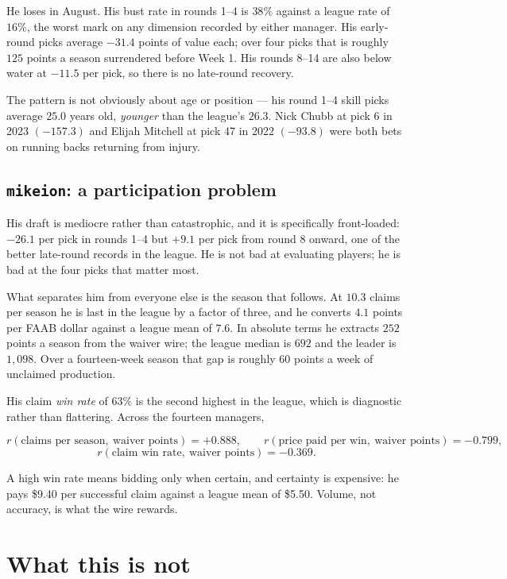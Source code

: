 \documentclass[11pt]{article}
\begin{document}
He loses in August. His bust rate in rounds 1--4 is $38\%$ against a league rate
of $16\%$, the worst mark on any dimension recorded by either manager. His
early-round picks average $-31.4$ points of value each; over four picks that is
roughly $125$ points a season surrendered before Week 1. His rounds 8--14 are
also below water at $-11.5$ per pick, so there is no late-round recovery.

The pattern is not obviously about age or position --- his round 1--4 skill picks
average $25.0$ years old, \emph{younger} than the league's $26.3$. Nick Chubb at
pick 6 in 2023 $(-157.3)$ and Elijah Mitchell at pick 47 in 2022 $(-93.8)$ were
both bets on running backs returning from injury.

\subsection*{\texttt{mikeion}: a participation problem}

His draft is mediocre rather than catastrophic, and it is specifically
front-loaded: $-26.1$ per pick in rounds 1--4 but $+9.1$ per pick from round 8
onward, one of the better late-round records in the league. He is not bad at
evaluating players; he is bad at the four picks that matter most.

What separates him from everyone else is the season that follows. At $10.3$
claims per season he is last in the league by a factor of three, and he converts
$4.1$ points per FAAB dollar against a league mean of $7.6$. In absolute terms he
extracts $252$ points a season from the waiver wire; the league median is $692$
and the leader is $1{,}098$. Over a fourteen-week season that gap is roughly $60$
points a week of unclaimed production.

His claim \emph{win rate} of $63\%$ is the second highest in the league, which is
diagnostic rather than flattering. Across the fourteen managers,

\[
  r(\text{claims per season},\ \text{waiver points}) = +0.888, \qquad
  r(\text{price paid per win},\ \text{waiver points}) = -0.799,
\]
\[
  r(\text{claim win rate},\ \text{waiver points}) = -0.369 .
\]

\noindent A high win rate means bidding only when certain, and certainty is
expensive: he pays \$9.40 per successful claim against a league mean of \$5.50.
Volume, not accuracy, is what the wire rewards.

\section{What this is not}
\end{document}
